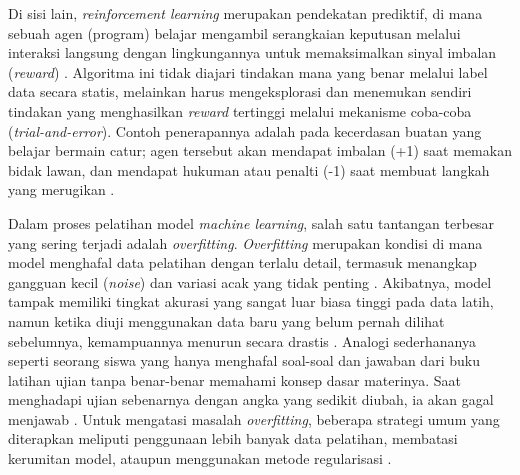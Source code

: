 Di sisi lain, \textit{reinforcement learning} merupakan pendekatan prediktif, di mana sebuah agen (program) belajar mengambil serangkaian keputusan melalui interaksi langsung dengan lingkungannya untuk memaksimalkan sinyal imbalan (\textit{reward}) \cite{sutton2018reinforcement}. Algoritma ini tidak diajari tindakan mana yang benar melalui label data secara statis, melainkan harus mengeksplorasi dan menemukan sendiri tindakan yang menghasilkan \textit{reward} tertinggi melalui mekanisme coba-coba (\textit{trial-and-error}). Contoh penerapannya adalah pada kecerdasan buatan yang belajar bermain catur; agen tersebut akan mendapat imbalan (+1) saat memakan bidak lawan, dan mendapat hukuman atau penalti (-1) saat membuat langkah yang merugikan \cite{silver2016mastering}.

Dalam proses pelatihan model \textit{machine learning}, salah satu tantangan terbesar yang sering terjadi adalah \textit{overfitting}. \textit{Overfitting} merupakan kondisi di mana model menghafal data pelatihan dengan terlalu detail, termasuk menangkap gangguan kecil (\textit{noise}) dan variasi acak yang tidak penting \cite{dietterich1995overfitting}. Akibatnya, model tampak memiliki tingkat akurasi yang sangat luar biasa tinggi pada data latih, namun ketika diuji menggunakan data baru yang belum pernah dilihat sebelumnya, kemampuannya menurun secara drastis \cite{hawkins2004problem}. Analogi sederhananya seperti seorang siswa yang hanya menghafal soal-soal dan jawaban dari buku latihan ujian tanpa benar-benar memahami konsep dasar materinya. Saat menghadapi ujian sebenarnya dengan angka yang sedikit diubah, ia akan gagal menjawab \cite{goodfellow2016deep}. Untuk mengatasi masalah \textit{overfitting}, beberapa strategi umum yang diterapkan meliputi penggunaan lebih banyak data pelatihan, membatasi kerumitan model, ataupun menggunakan metode regularisasi \cite{hastie2009elements}.




